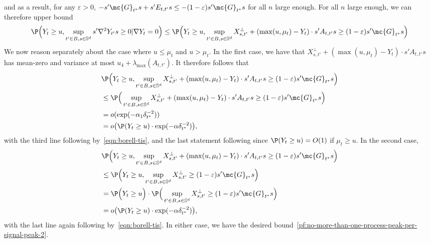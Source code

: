 \documentclass{article}
\begin{document}
	and as a result, for any $\varepsilon > 0$, $-s'\mc{G}_{t^{\ast}}s + s' E_{t,t'}s \leq -(1 - \varepsilon) s'\mc{G}_{t^{\ast}}s$ for all $n$ large enough. For all $n$ large enough, we can therefore upper bound
	$$
	\P\Big(Y_t \geq u, \sup_{t' \in B, s \in \mathbb{S}^{d}} s' \nabla^2 Y_{t'} s \geq 0|\nabla Y_t = 0\Big) \leq \P\Big(Y_t \geq u, \sup_{t' \in B, s \in \mathbb{S}^{d}} X_{s,t'}^{\perp} + (\max(u,\mu_t) - Y_{t}) \cdot s' A_{t,t'} s \geq (1 - \varepsilon) s'\mc{G}_{t^{\ast}} s \Big)
	$$
	We now reason separately about the case where $u \leq \mu_t$ and $u > \mu_t$. In the first case, we have that $X_{s,t'}^{\perp} + (\max(u,\mu_t) - Y_{t}) \cdot s' A_{t,t'} s$ has mean-zero and variance at most $u_4 + \lambda_{\max}(A_{t,t'})$. It therefore follows that 
	\begin{align*}
		& \P\Big(Y_t \geq u, \sup_{t' \in B, s \in \mathbb{S}^{d}} X_{s,t'}^{\perp} + (\max(u,\mu_t) - Y_{t}) \cdot s' A_{t,t'} s \geq (1 - \varepsilon) s'\mc{G}_{t^{\ast}} s\Big) \\
		& \leq \P\Big(\sup_{t' \in B, s \in \mathbb{S}^{d}} X_{s,t'}^{\perp} + (\max(u,\mu_t) - Y_{t}) \cdot s' A_{t,t'} s \geq (1 - \varepsilon) s'\mc{G}_{t^{\ast}} s\Big) \\
		& = o(\exp(-\alpha_1 \delta_{t^{\ast}}^{-2})) \\
		& = o\big(\P(Y_t \geq u) \cdot \exp(-\alpha \delta_{t^{\ast}}^{-2})\big),
	\end{align*}
	with the third line following by~\eqref{eqn:borell-tis}, and the last statement following since $\P(Y_t \geq u) = O(1)$ if $\mu_t \geq u$. In the second case, 
	\begin{align*}
		& \P\Big(Y_t \geq u, \sup_{t' \in B, s \in \mathbb{S}^{d}} X_{s,t'}^{\perp} + (\max(u,\mu_t) - Y_{t}) \cdot s' A_{t,t'} s \geq (1 - \varepsilon) s'\mc{G}_{t^{\ast}} s\Big) \\
		& \leq \P\Big(Y_t \geq u, \sup_{t' \in B, s \in \mathbb{S}^{d}} X_{s,t'}^{\perp} \geq (1 - \varepsilon) s'\mc{G}_{t^{\ast}} s\Big) \\
		& = \P\Big(Y_t \geq u\Big) \cdot \P\Big(\sup_{t' \in B, s \in \mathbb{S}^{d}} X_{s,t'}^{\perp} \geq (1 - \varepsilon) s'\mc{G}_{t^{\ast}} s\Big) \\
		& = o\big(\P(Y_t \geq u) \cdot \exp(-\alpha \delta_{t^{\ast}}^{-2})\big),
	\end{align*}
	with the last line again following by~\eqref{eqn:borell-tis}. In either case, we have the desired bound~\eqref{pf:no-more-than-one-process-peak-per-signal-peak-2}.
	\fi
	
\end{document}
